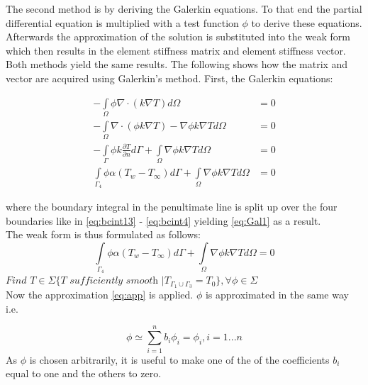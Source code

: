 \documentclass[10pt,a4paper]{article}
\begin{document}
The second method is by deriving the Galerkin equations. To that end the partial differential equation is multiplied with a test function $\phi$ to derive these equations. Afterwards the approximation of the solution is substituted into the weak form which then results in the element stiffness matrix and element stiffness vector. \\

Both methods yield the same results. The following shows how the matrix and vector are acquired using Galerkin's method. First, the Galerkin equations:

\begin{align}\label{eq:Gal1}
-\underset{\Omega}{\int}\phi \nabla \cdot(k\nabla T)d\Omega&=0\nonumber\\
-\underset{\Omega}{\int} \nabla \cdot \left(\phi k \nabla T\right)- \nabla \phi k \nabla Td\Omega &=0\nonumber\\
-\underset{\Gamma}{\int}\phi k \frac{\partial T}{\partial n} d\Gamma + \underset{\Omega}{\int}\nabla \phi k \nabla Td\Omega &=0\nonumber\\
\underset{\Gamma_4}{\int}\phi \alpha \left(T_w -T_{\infty}\right)d\Gamma + \underset{\Omega}{\int}\nabla \phi k \nabla T d\Omega&=0
\end{align}

where the boundary integral in the penultimate line is split up over the four boundaries like in \eqref{eq:bcint13} - \eqref{eq:bcint4} yielding \eqref{eq:Gal1} as a result. \\

The weak form is thus formulated as follows:
\begin{equation*}
\underset{\Gamma_4}{\int}\phi \alpha \left(T_w -T_{\infty}\right)d\Gamma + \underset{\Omega}{\int}\nabla \phi k \nabla T d\Omega=0
\end{equation*}
$\textit{Find } T\in \Sigma\{\textit{T sufficiently smooth } \rvert T_{\Gamma_1 \cup \Gamma_3 }=T_0\}, \forall \phi \in \Sigma$\\

Now the approximation \eqref{eq:app} is applied. $\phi$ is approximated in the same way i.e.

\begin{equation*}
\phi \simeq \displaystyle\sum^n_{i=1} b_i \phi_i = \phi_i, i=1...n 
\end{equation*}
As $\phi$ is chosen arbitrarily, it is useful to make one of the of the coefficients $b_i$ equal to one and the others to zero.\\
\end{document}
